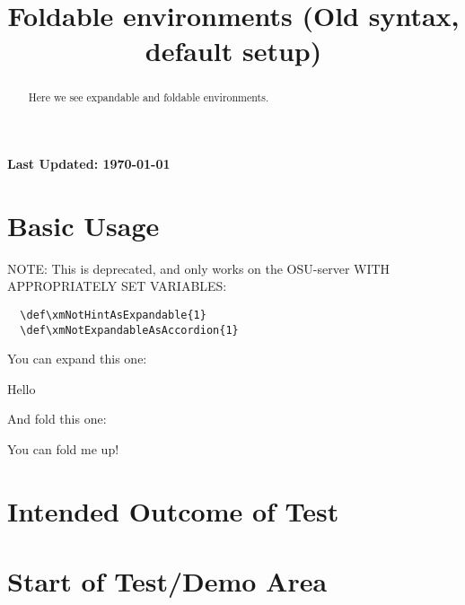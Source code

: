 \documentclass{ximera}
\title{Foldable environments (Old syntax, default setup)}
\begin{document}
\begin{abstract}
  Here we see expandable and foldable environments.
\end{abstract}
\maketitle

{{\Huge \bfseries Last Updated: \today}} \\

\section{Basic Usage}


NOTE: This is deprecated, and only works on the OSU-server WITH APPROPRIATELY SET VARIABLES:

\begin{verbatim}
  \def\xmNotHintAsExpandable{1}
  \def\xmNotExpandableAsAccordion{1}
\end{verbatim}

You can expand this one:

\begin{expandable}
  Hello
 \begin{center}
 \end{center}
\end{expandable}



And fold this one:

\begin{foldable}
  You can fold me up!
\end{foldable}



\section{Intended Outcome of Test}



\section{Start of Test/Demo Area}




\hrulefill
\end{document}
